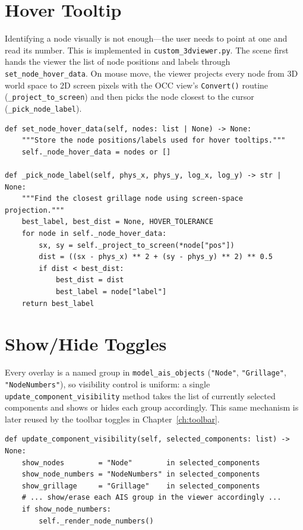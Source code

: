 \section{Hover Tooltip}
Identifying a node visually is not enough---the user needs to point at one and read its number.
This is implemented in \texttt{custom\_3dviewer.py}. The scene first hands the viewer the list
of node positions and labels through \texttt{set\_node\_hover\_data}. On mouse move, the viewer
projects every node from 3D world space to 2D screen pixels with the OCC view's
\texttt{Convert()} routine (\texttt{\_project\_to\_screen}) and then picks the node closest to
the cursor (\texttt{\_pick\_node\_label}).

\begin{lstlisting}[caption={Screen-space projection and nearest-node picking (\texttt{custom\_3dviewer.py}).},label={lst:hover}]
def set_node_hover_data(self, nodes: list | None) -> None:
    """Store the node positions/labels used for hover tooltips."""
    self._node_hover_data = nodes or []

def _pick_node_label(self, phys_x, phys_y, log_x, log_y) -> str | None:
    """Find the closest grillage node using screen-space projection."""
    best_label, best_dist = None, HOVER_TOLERANCE
    for node in self._node_hover_data:
        sx, sy = self._project_to_screen(*node["pos"])
        dist = ((sx - phys_x) ** 2 + (sy - phys_y) ** 2) ** 0.5
        if dist < best_dist:
            best_dist = dist
            best_label = node["label"]
    return best_label
\end{lstlisting}

\section{Show/Hide Toggles}
Every overlay is a named group in \texttt{model\_ais\_objects} (\texttt{"Node"},
\texttt{"Grillage"}, \texttt{"NodeNumbers"}), so visibility control is uniform: a single
\texttt{update\_component\_visibility} method takes the list of currently selected components
and shows or hides each group accordingly. This same mechanism is later reused by the toolbar
toggles in Chapter~\ref{ch:toolbar}.

\begin{lstlisting}[caption={Uniform visibility control over the named overlays (\texttt{cad\_3d.py}).},label={lst:visibility}]
def update_component_visibility(self, selected_components: list) -> None:
    show_nodes        = "Node"        in selected_components
    show_node_numbers = "NodeNumbers" in selected_components
    show_grillage     = "Grillage"    in selected_components
    # ... show/erase each AIS group in the viewer accordingly ...
    if show_node_numbers:
        self._render_node_numbers()
\end{lstlisting}

